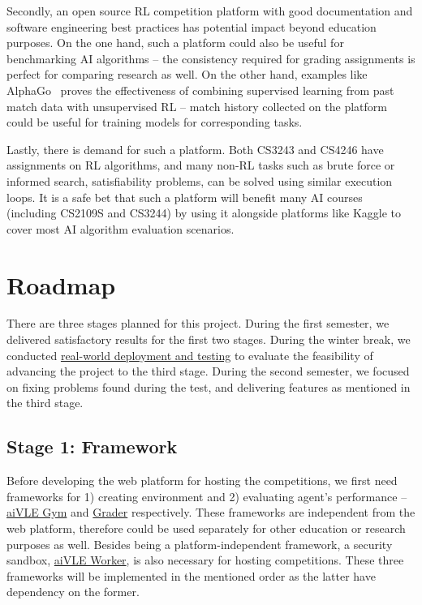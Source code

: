 Secondly, an open source RL competition platform with good documentation and software engineering best practices has potential impact beyond education purposes. On the one hand, such a platform could also be useful for benchmarking AI algorithms – the consistency required for grading assignments is perfect for comparing research as well. On the other hand, examples like AlphaGo~\parencite{alphago} proves the effectiveness of combining supervised learning from past match data with unsupervised RL – match history collected on the platform could be useful for training models for corresponding tasks. 

Lastly, there is demand for such a platform. Both CS3243 and CS4246 have assignments on RL algorithms, and many non-RL tasks such as brute force or informed search, satisfiability problems, can be solved using similar execution loops. It is a safe bet that such a platform will benefit many AI courses (including CS2109S and CS3244) by using it alongside platforms like Kaggle to cover most AI algorithm evaluation scenarios.

\section{Roadmap}
\label{s:project-objective-roadmap}
There are three stages planned for this project. During the first semester, we delivered satisfactory results for the first two stages. During the winter break, we conducted \hyperref[ch:deployment-and-testing]{real-world deployment and testing} to evaluate the feasibility of advancing the project to the third stage. During the second semester, we focused on fixing problems found during the test, and delivering features as mentioned in the third stage.

\subsection{Stage 1: Framework}
Before developing the web platform for hosting the competitions, we first need frameworks for 1) creating environment and 2) evaluating agent’s performance – \hyperref[ch:aivle-gym]{aiVLE Gym} and \hyperref[ch:aivle-grader]{Grader} respectively. These frameworks are independent from the web platform, therefore could be used separately for other education or research purposes as well.
Besides being a platform-independent framework, a security sandbox, \hyperref[ch:aivle-worker]{aiVLE Worker}, is also necessary for hosting competitions. These three frameworks will be implemented in the mentioned order as the latter have dependency on the former.

